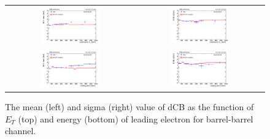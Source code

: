\begin{figure}[ht]
  \begin{center}
    \begin{tabular}{cc}
      \includegraphics[width=0.48\textwidth]{figures/Zprime/2017/mass_resolution/scale_check/h_led_Et_Mee_BB_scale} &
      \includegraphics[width=0.48\textwidth]{figures/Zprime/2017/mass_resolution/scale_check/h_led_Et_Mee_BB_resolution} \\
      \includegraphics[width=0.48\textwidth]{figures/Zprime/2017/mass_resolution/scale_check/h_led_E_Mee_BB_scale} &
      \includegraphics[width=0.48\textwidth]{figures/Zprime/2017/mass_resolution/scale_check/h_led_E_Mee_BB_resolution}
    \end{tabular}
    \caption{The mean (left) and sigma (right) value of dCB as the function of $E_{T}$ (top) and energy (bottom) of leading electron for barrel-barrel channel.
    \label{fig:data_MC_Et_E_BB}}
  \end{center}
\end{figure}

